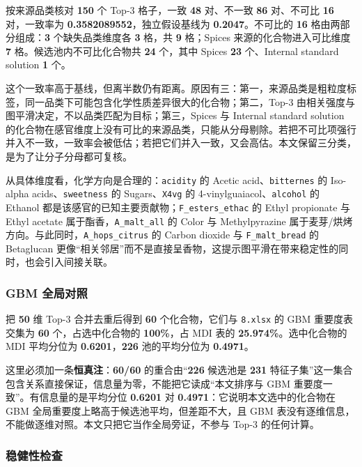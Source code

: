按来源品类核对 \textbf{150} 个 Top-3 格子，一致 \textbf{48} 对、不一致 \textbf{86} 对、不可比 \textbf{16} 对，一致率为 \textbf{0.3582089552}，独立假设基线为 \textbf{0.2047}。不可比的 \textbf{16} 格由两部分组成：\textbf{3} 个缺失品类维度各 \textbf{3} 格，共 \textbf{9} 格；Spices 来源的化合物进入可比维度 \textbf{7} 格。候选池内不可比化合物共 \textbf{24} 个，其中 Spices \textbf{23} 个、Internal standard solution \textbf{1} 个。

这个一致率高于基线，但离半数仍有距离。原因有三：第一，来源品类是粗粒度标签，同一品类下可能包含化学性质差异很大的化合物；第二，Top-3 由相关强度与图平滑决定，不以品类匹配为目标；第三，Spices 与 Internal standard solution 的化合物在感官维度上没有可比的来源品类，只能从分母剔除。若把不可比项强行并入不一致，一致率会被低估；若把它们并入一致，又会高估。本文保留三分类，是为了让分子分母都可复核。

从具体维度看，化学方向是合理的：\texttt{acidity} 的 Acetic acid、\texttt{bitternes} 的 Iso-alpha acids、\texttt{sweetness} 的 Sugars、\texttt{X4vg} 的 4-vinylguaiacol、\texttt{alcohol} 的 Ethanol 都是该感官的已知主要贡献物；\texttt{F\_esters\_ethac} 的 Ethyl propionate 与 Ethyl acetate 属于酯香，\texttt{A\_malt\_all} 的 Color 与 Methylpyrazine 属于麦芽/烘烤方向。与此同时，\texttt{A\_hops\_citrus} 的 Carbon dioxide 与 \texttt{F\_malt\_bread} 的 Betaglucan 更像“相关邻居”而不是直接呈香物，这提示图平滑在带来稳定性的同时，也会引入间接关联。

\subsubsection{GBM 全局对照}

把 \textbf{50} 维 Top-3 合并去重后得到 \textbf{60} 个化合物，它们与 \texttt{8.xlsx} 的 GBM 重要度表交集为 \textbf{60} 个，占选中化合物的 \textbf{100\%}，占 MDI 表的 \textbf{25.974\%}。选中化合物的 MDI 平均分位为 \textbf{0.6201}，\textbf{226} 池的平均分位为 \textbf{0.4971}。

这里必须加一条\textbf{恒真注}：\textbf{60/60} 的重合由“\textbf{226} 候选池是 \textbf{231} 特征子集”这一集合包含关系直接保证，信息量为零，不能把它读成“本文排序与 GBM 重要度一致”。有信息量的是平均分位 \textbf{0.6201} 对 \textbf{0.4971}：它说明本文选中的化合物在 GBM 全局重要度上略高于候选池平均，但差距不大，且 GBM 表没有逐维信息，不能做逐维对照。本文只把它当作全局旁证，不参与 Top-3 的任何计算。

\subsubsection{稳健性检查}

